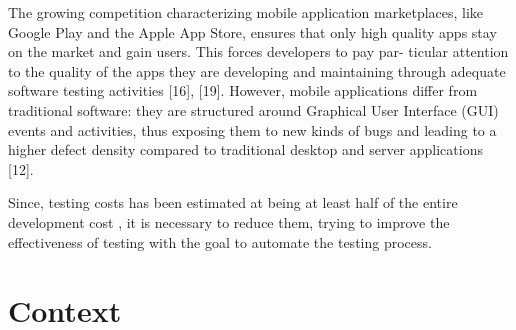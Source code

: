 The growing competition characterizing mobile application marketplaces, like Google Play and the Apple App Store, ensures that only high quality apps stay on the market and gain users. This forces developers to pay par- ticular attention to the quality of the apps they are developing and maintaining through adequate software testing activities [16], [19]. However, mobile applications differ from traditional software: they are structured around Graphical User Interface (GUI) events and activities, thus exposing them to new kinds of bugs and leading to a higher defect density compared to traditional desktop and server applications [12].






Since, testing costs has been estimated at being at least half of the entire development cost \cite{Beizer:1990:STT:79060}, it is necessary to reduce them, trying to improve the effectiveness of testing with the goal to automate the testing process.
\section{Context}




